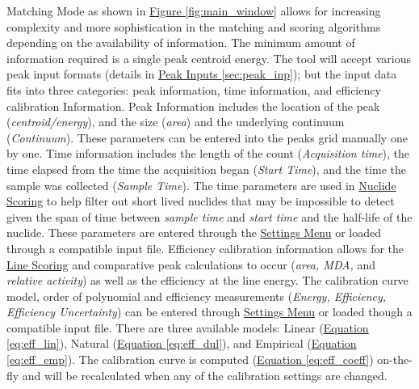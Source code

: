 \documentclass[12pt,report,justified]{SANDreport}
\begin{document}
Matching Mode as shown in \hyperref[fig:main_window]{Figure \ref{fig:main_window}} allows for
increasing complexity and more sophistication in the matching and scoring algorithms depending
on the availability of information. The minimum amount of information required is a single peak
centroid energy. The tool will accept various peak input formats (details in
\hyperref[sec:peak_inp]{Peak Inputs \ref{sec:peak_inp}}); but the input data fits into three
categories: peak information, time information, and efficiency calibration Information. Peak
Information includes the location of the peak (\textit{centroid/energy}), and the size
(\textit{area}) and the underlying continuum (\textit{Continuum}). These parameters can be
entered into the peaks grid manually one by one. Time information includes the length of the count
(\textit{Acquisition time}), the time elapsed from the time the acquisition began
(\textit{Start Time}), and the time the sample was collected (\textit{Sample Time}). The time
parameters are used in \hyperref[sec:score]{Nuclide Scoring} to help filter out short lived
nuclides that may be impossible to detect given the span of time between \textit{sample time} and
\textit{start time} and the half-life of the nuclide. These parameters are entered through the
\hyperref[sec:set_menu]{Settings Menu} or loaded through a compatible input file. Efficiency
calibration information allows for the \hyperref[sec:sec:ln_score]{Line Scoring} and comparative
peak calculations to occur (\textit{area, MDA,} and \textit{relative activity}) as well as the
efficiency at the line energy. The calibration curve model, order of polynomial and efficiency
measurements (\textit{Energy, Efficiency, Efficiency Uncertainty}) can be entered through
\hyperref[sec:set_menu]{Settings Menu} or loaded though a compatible input file. There are three
available models: Linear (\hyperref[sec:eq:eff_lin]{Equation \ref{eq:eff_lin}}), Natural
(\hyperref[eq:eff_dul]{Equation \ref{eq:eff_dul}}), and Empirical
(\hyperref[eq:eff_emp]{Equation \ref{eq:eff_emp}}). The calibration curve is computed
(\hyperref[eq:eff_coeff]{Equation \ref{eq:eff_coeff}}) on-the-fly and will be recalculated when any
of the calibration settings are changed.
\end{document}
